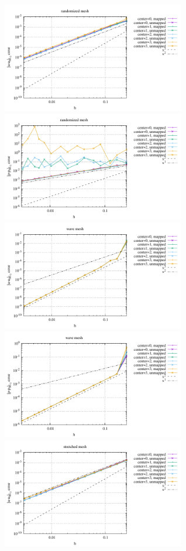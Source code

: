 \begin{center}
\includegraphics[width=8cm]{python_codes/fieldstone_76/results/bench9/curved/errors_V_mt2.pdf}
\includegraphics[width=8cm]{python_codes/fieldstone_76/results/bench9/curved/errors_P_mt2.pdf}\\
\includegraphics[width=8cm]{python_codes/fieldstone_76/results/bench9/curved/errors_V_mt3.pdf}
\includegraphics[width=8cm]{python_codes/fieldstone_76/results/bench9/curved/errors_P_mt3.pdf}\\
\includegraphics[width=8cm]{python_codes/fieldstone_76/results/bench9/curved/errors_V_mt4.pdf}

\end{center}
